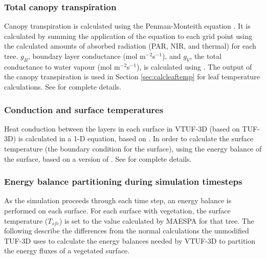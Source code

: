 \documentclass[final,3p,times,authoryear]{elsarticle}
\begin{document}
\subsubsection{Total canopy transpiration}\label{sec:totalcanopy}

Canopy transpiration is calculated using the Penman-Monteith equation \citep{Penman1948,Monteith1965}. It is calculated by summing the application of the equation to each grid point using the calculated amounts of absorbed radiation (PAR, NIR, and thermal) for each tree. $g_{B}$, boundary layer conductance (mol m$^{-2}$s$^{-1}$), and $g_{V}$, the total conductance to water vapour (mol m$^{-2}$s$^{-1}$), is calculated using \cite{Jones1992}. The output of the canopy transpiration is used in Section \ref{sec:calcleaftemp} for leaf temperature calculations. See \cite{Duursma2012} for complete details.



\subsubsection{Conduction and surface temperatures}

Heat conduction between the layers in each surface in VTUF-3D (based on TUF-3D) is calculated in a 1-D equation, based on \cite{Masson2000}. In order to calculate the surface temperature (the boundary condition for the surface), using the energy balance of the surface, based on a version of \cite{Arnfield1990}. See \cite{Krayenhoff2007} for complete details.


\subsubsection{Energy balance partitioning during simulation timesteps}\label{sec:parttimestep}

As the simulation proceeds through each time step, an energy balance is performed on each surface. For each surface with vegetation, the surface temperature ($T_{sfc}$) is set to the value calculated by MAESPA for that tree. The following describe the differences from the normal calculations the unmodified TUF-3D uses to calculate the energy balances needed by VTUF-3D to partition the energy fluxes of a vegetated surface.
\end{document}

